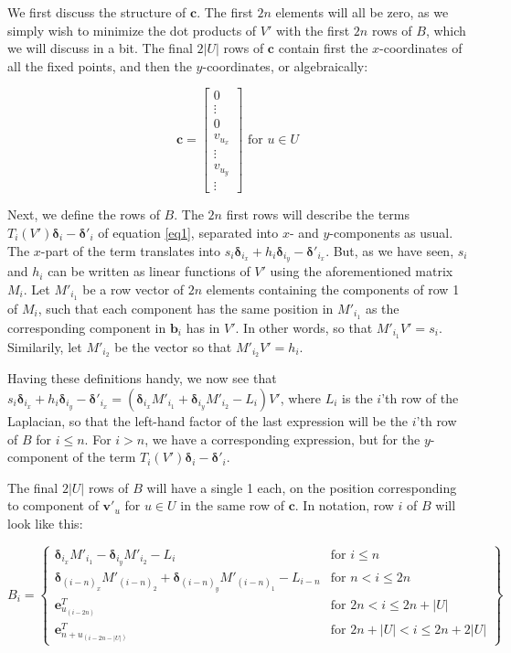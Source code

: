 \documentclass[english]{article}
\begin{document}
We first discuss the structure of $\mathbf{c}$. The first $2n$ elements will all be zero, as we simply wish to minimize the dot products of $V'$ with the first $2n$ rows of $B$, which we will discuss in a bit. The final $2|U|$ rows of $\mathbf{c}$ contain first the $x$-coordinates of all the fixed points, and then the $y$-coordinates, or algebraically:

\[
\mathbf{c} = 
\begin{bmatrix}
  0 \\
  \vdots \\
  0 \\
  v_{u_x} \\
  \vdots \\
  v_{u_y} \\
  \vdots
\end{bmatrix}
\text{ for } u \in U
\]

Next, we define the rows of $B$. The $2n$ first rows will describe the terms $T_i(V')\mathbf{\delta}_i - \mathbf{\delta'}_i$ of equation \ref{eq1}, separated into $x$- and $y$-components as usual. The $x$-part of the term translates into $s_i\mathbf{\delta}_{i_x} + h_i\mathbf{\delta}_{i_y} - \mathbf{\delta'}_{i_x}$. But, as we have seen, $s_i$ and $h_i$ can be written as linear functions of $V'$ using the aforementioned matrix $M_i$. Let $M'_{i_1}$ be a row vector of $2n$ elements containing the components of row 1 of $M_i$, such that each component has the same position in $M'_{i_1}$ as the corresponding component in $\mathbf{b}_i$ has in $V'$. In other words, so that $M'_{i_1}V' = s_i$. Similarily, let $M'_{i_2}$ be the vector so that $M'_{i_2}V' = h_i$.

Having these definitions handy, we now see that $s_i\mathbf{\delta}_{i_x} + h_i\mathbf{\delta}_{i_y} - \mathbf{\delta'}_{i_x} = (\mathbf{\delta}_{i_x}M'_{i_1} + \mathbf{\delta}_{i_y}M'_{i_2} - L_i)V'$, where $L_i$ is the $i$'th row of the Laplacian, so that the left-hand factor of the last expression will be the $i$'th row of $B$ for $i \leq n$. For $i > n$, we have a corresponding expression, but for the $y$-component of the term $T_i(V') \mathbf{\delta}_i - \mathbf{\delta'}_i$.

The final $2|U|$ rows of $B$ will have a single 1 each, on the position corresponding to component of $\mathbf{v'}_u$ for $u \in U$ in the same row of $\mathbf{c}$. In notation, row $i$ of $B$ will look like this:

\[
B_i = \left\{\begin{array}{lr}
\mathbf{\delta}_{i_x}M'_{i_1} - \mathbf{\delta}_{i_y}M'_{i_2} - L_i & \text{for } i \leq n \\
\mathbf{\delta}_{{(i-n)}_x}M'_{{(i-n)}_2} + \mathbf{\delta}_{{(i-n)}_y}M'_{{(i-n)}_1} - L_{i-n} & \text{for } n < i \leq 2n \\
\mathbf{e}^T_{u_{(i - 2n)}} & \text{for } 2n < i \leq 2n + |U| \\
\mathbf{e}^T_{n + u_{(i - 2n - |U|)}} & \text{for } 2n + |U| < i \leq 2n + 2|U|
\end{array}\right\}
\]
\end{document}
